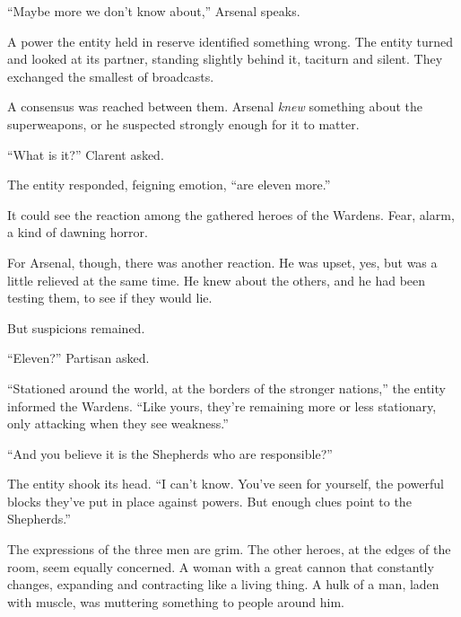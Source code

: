 ``Maybe more we don't know about,'' Arsenal speaks.



A power the entity held in reserve identified something wrong.  The entity turned and looked at its partner, standing slightly behind it, taciturn and silent.  They exchanged the smallest of broadcasts.



A consensus was reached between them.  Arsenal \emph{knew }something about the superweapons, or he suspected strongly enough for it to matter.



``What is it?'' Clarent asked.



The entity responded, feigning emotion, ``\ldotsThere are eleven more.''



It could see the reaction among the gathered heroes of the Wardens.  Fear, alarm, a kind of dawning horror.



For Arsenal, though, there was another reaction.  He was upset, yes, but was a little relieved at the same time.  He knew about the others, and he had been testing them, to see if they would lie.



But suspicions remained.



``Eleven?''  Partisan asked.



``Stationed around the world, at the borders of the stronger nations,'' the entity informed the Wardens.  ``Like yours, they're remaining more or less stationary, only attacking when they see weakness.''



``And you believe it is the Shepherds who are responsible?''



The entity shook its head.  ``I can't know.  You've seen for yourself, the powerful blocks they've put in place against powers.  But enough clues point to the Shepherds.''



The expressions of the three men are grim.  The other heroes, at the edges of the room, seem equally concerned.  A woman with a great cannon that constantly changes, expanding and contracting like a living thing.  A hulk of a man, laden with muscle, was muttering something to people around him.



